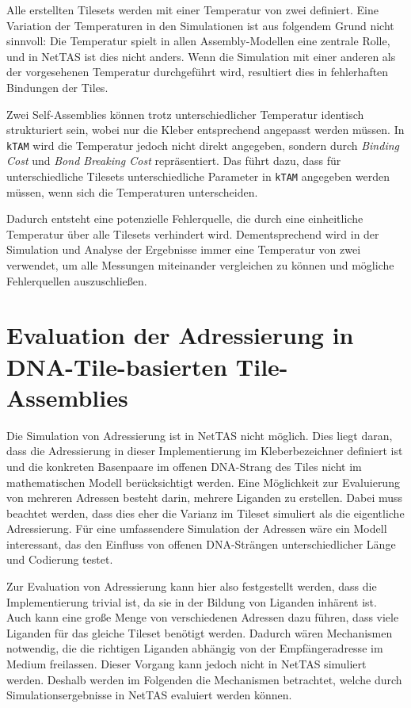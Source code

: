 Alle erstellten Tilesets werden mit einer Temperatur von zwei definiert. Eine Variation der Temperaturen in den Simulationen ist aus folgendem Grund nicht sinnvoll: Die Temperatur spielt in allen Assembly-Modellen eine zentrale Rolle, und in NetTAS ist dies nicht anders. Wenn die Simulation mit einer anderen als der vorgesehenen Temperatur durchgeführt wird, resultiert dies in fehlerhaften Bindungen der Tiles. 

Zwei Self-Assemblies können trotz unterschiedlicher Temperatur identisch strukturiert sein, wobei nur die Kleber entsprechend angepasst werden müssen. In \texttt{kTAM} wird die Temperatur jedoch nicht direkt angegeben, sondern durch \emph{Binding Cost} und \emph{Bond Breaking Cost} repräsentiert. Das führt dazu, dass für unterschiedliche Tilesets unterschiedliche Parameter in \texttt{kTAM} angegeben werden müssen, wenn sich die Temperaturen unterscheiden.

Dadurch entsteht eine potenzielle Fehlerquelle, die durch eine einheitliche Temperatur über alle Tilesets verhindert wird. Dementsprechend wird in der Simulation und Analyse der Ergebnisse immer eine Temperatur von zwei verwendet, um alle Messungen miteinander vergleichen zu können und mögliche Fehlerquellen auszuschließen.

\section{Evaluation der Adressierung in DNA-Tile-basierten Tile-Assemblies}

Die Simulation von Adressierung ist in NetTAS nicht möglich. Dies liegt daran, dass die Adressierung in dieser Implementierung im Kleberbezeichner definiert ist und die konkreten Basenpaare im offenen DNA-Strang des Tiles nicht im mathematischen Modell berücksichtigt werden. Eine Möglichkeit zur Evaluierung von mehreren Adressen besteht darin, mehrere Liganden zu erstellen. Dabei muss beachtet werden, dass dies eher die Varianz im Tileset simuliert als die eigentliche Adressierung. Für eine umfassendere Simulation der Adressen wäre ein Modell interessant, das den Einfluss von offenen DNA-Strängen unterschiedlicher Länge und Codierung testet.

Zur Evaluation von Adressierung kann hier also festgestellt werden, dass die Implementierung trivial ist, da sie in der Bildung von Liganden inhärent ist. Auch kann eine große Menge von verschiedenen Adressen dazu führen, dass viele Liganden für das gleiche Tileset benötigt werden. Dadurch wären Mechanismen notwendig, die die richtigen Liganden abhängig von der Empfängeradresse im Medium freilassen. Dieser Vorgang kann jedoch nicht in NetTAS simuliert werden. Deshalb werden im Folgenden die Mechanismen betrachtet, welche durch Simulationsergebnisse in NetTAS evaluiert werden können.

